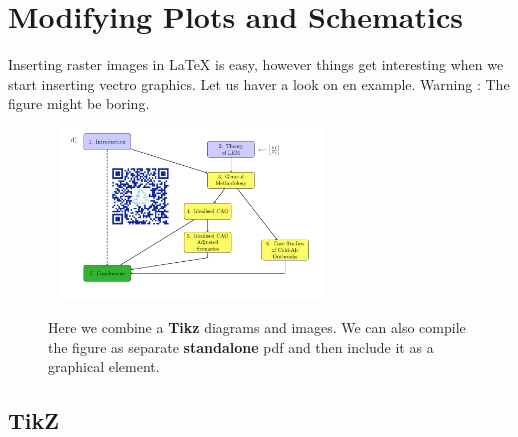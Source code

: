 \documentclass[a4paper,10pt]{report} %
\begin{document}
\newpage 
 \section{Modifying Plots and Schematics}\label{sec:figures}
 
 Inserting raster images in LaTeX is easy, however things get interesting when we start inserting vectro graphics. Let us haver a look on en example. Warning :  The figure might be boring.\\
 \begin{figure}[!ht] 
      ~\hspace{-2ex}
    \includegraphics[width=0.62\textwidth]{./figures/standalone.pdf}
        \caption[Diagrams and plots]{Here we combine a \textbf{Tikz} diagrams and images. We can also compile the figure as separate \textbf{standalone}  pdf and then include it as a graphical element. }  
      \label{fig:figures}    
 \end{figure}
 
 
 \subsection{TikZ}
 
\end{document}
